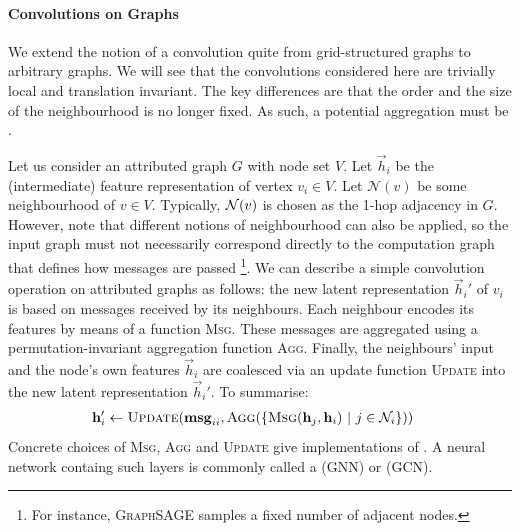 \documentclass[
	fontsize=10pt, %
	twoside=false, %
	secnumdepth=1, %
  toc=indentunnumbered %
]{kaobook}
\begin{document}
\paragraph{Convolutions on Graphs} We extend the notion of a convolution
quite from grid-structured graphs to arbitrary graphs. We will see that
the convolutions considered here are trivially local and translation invariant.
The key differences are that the order and the size of the neighbourhood is no
longer fixed. As such, a potential aggregation must be .

Let us consider an attributed graph
$G$ with node set $V$.
Let $\vec h_i$ be the (intermediate) feature representation of vertex
$v_i \in V$. Let $\mathcal{N}(v)$ be some neighbourhood of $v \in V$. Typically,
$\mathcal{N}(v)$ is chosen as the 1-hop adjacency in $G$. However, note that
different notions of neighbourhood can also be applied, so the input graph must
not necessarily correspond directly to the computation graph that defines how
messages are passed \footnote{ For instance, \textsc{GraphSAGE}
  \cite{hamilton_InductiveRepresentationLearning_2018} samples a fixed number of
  adjacent nodes. }. We can describe a simple convolution operation on
attributed graphs as follows: the new latent representation $\vec h_i'$ of $v_i$
is based on messages received by its neighbours. Each neighbour encodes its
features by means of a function \textsc{Msg}. These messages are
aggregated using a permutation-invariant aggregation function \textsc{Agg}.
Finally, the neighbours' input and the node's own features $\vec h_i$ are
coalesced via an update function \textsc{Update} into the new latent
representation $\vec h_i'$. To summarise:
\begin{align}
  & \vec h_i' \gets \textsc{Update}(\vec{msg}_{ii}, \textsc{Agg}(\{\textsc{Msg}(\vec h_j, \vec h_i) ~|~ j \in \mathcal{N}_i\}))
    \label{eq:gnn-framework}
\end{align}
Concrete choices of \textsc{Msg}, \textsc{Agg} and \textsc{Update} give
implementations of . A neural network containg
such layers is commonly called a  (GNN)
or  (GCN).
\end{document}
